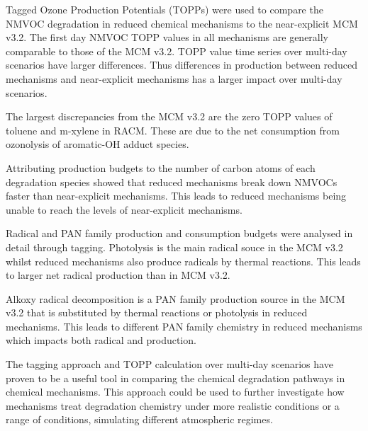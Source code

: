 Tagged Ozone Production Potentials (TOPPs) were used to compare the NMVOC degradation in reduced chemical mechanisms to the near-explicit MCM v3.2. 
The first day NMVOC TOPP values in all mechanisms are generally comparable to those of the MCM v3.2. 
TOPP value time series over multi-day scenarios have larger differences. 
Thus differences in  production between reduced mechanisms and near-explicit mechanisms has a larger impact over multi-day scenarios. 

The largest discrepancies from the MCM v3.2 are the zero TOPP values of toluene and m-xylene in RACM. 
These are due to the net  consumption from ozonolysis of aromatic-OH adduct species.

Attributing  production budgets to the number of carbon atoms of each degradation species showed that reduced mechanisms break down NMVOCs faster than near-explicit mechanisms. 
This leads to reduced mechanisms being unable to reach the  levels of near-explicit mechanisms.

Radical and PAN family production and consumption budgets were analysed in detail through tagging. 
Photolysis is the main radical souce in the MCM v3.2 whilst reduced mechanisms also produce radicals by thermal reactions. 
This leads to larger net radical production than in MCM v3.2.

Alkoxy radical decomposition is a PAN family production source in the MCM v3.2 that is substituted by thermal reactions or photolysis in reduced mechanisms. 
This leads to different PAN family chemistry in reduced mechanisms which impacts both radical and  production.

The tagging approach and TOPP calculation over multi-day scenarios have proven to be a useful tool in comparing the chemical degradation pathways in chemical mechanisms. 
This approach could be used to further investigate how mechanisms treat degradation chemistry under more realistic  conditions or a range of  conditions, simulating different atmospheric regimes. 
